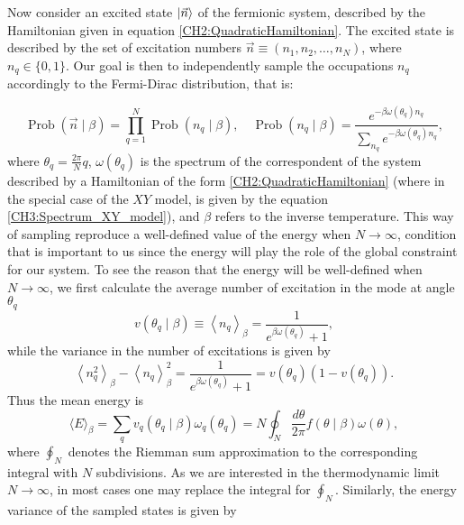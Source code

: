 \indent Now consider an excited state $\mathinner{|{\vec{n}}\rangle}$ of the fermionic system, described by the Hamiltonian given in equation \eqref{CH2:QuadraticHamiltonian}. The excited state is described by the set of excitation numbers $\vec{n}\equiv (n_1,n_2,\ldots,n_N)$, where $n_q \in \{0,1\}$. Our goal is then to independently sample the occupations $n_q$ accordingly to the Fermi-Dirac distribution, that is:

\begin{equation}
\operatorname{Prob}(\vec{n} \mid \beta)=\prod_{q=1}^{N} \operatorname{Prob}\left(n_{q} \mid \beta\right), \quad \operatorname{Prob}\left(n_{q} \mid \beta\right)=\frac{e^{-\beta \omega\left(\theta_{q}\right) n_{q}}}{\sum_{n_{q}} e^{-\beta \omega\left(\theta_{q}\right) n_{q}}},
\label{CH3:Gibbs_Sampling}
\end{equation}
where $\theta_q = \frac{2\pi}{N} q$, $\omega(\theta_q)$ is the spectrum of the correspondent of the system described by a Hamiltonian of the form \eqref{CH2:QuadraticHamiltonian} (where in the special case of the $XY$ model, is given by the equation \eqref{CH3:Spectrum_XY_model}), and $\beta$ refers to the inverse temperature. This way of sampling reproduce a well-defined value of the energy when $N\to\infty$, condition that is important to us since the energy will play the role of the global constraint for our system. To see the reason that the energy will be well-defined when $N\to\infty$, we first calculate the average number of excitation in the mode at angle $\theta_q$
\begin{equation}
v\left(\theta_{q} \mid \beta\right) \equiv\left\langle n_{q}\right\rangle_{\beta}=\frac{1}{e^{\beta \omega\left(\theta_{q}\right)} + 1},
\end{equation}
while the variance in the number of excitations is given by
\begin{equation}
\left\langle n_{q}^{2}\right\rangle_{\beta}-\left\langle n_{q}\right\rangle_{\beta}^{2}=\frac{1}{e^{\beta \omega\left(\theta_{q}\right)} + 1}=v\left(\theta_{q}\right)\left(1 - v\left(\theta_{q}\right)\right).
\end{equation}
Thus the mean energy is
\begin{equation}
\langle E\rangle_{\beta}=\sum_{q} v_{q}\left(\theta_{q} \mid \beta\right) \omega_{q}\left(\theta_{q}\right)=N \oint_{N} \frac{d \theta}{2 \pi} f(\theta \mid \beta) \omega(\theta),
\label{CH3:Approx_to_integral}
\end{equation}
where $\oint_{N}$ denotes the Riemman sum approximation to the corresponding integral with $N$ subdivisions. As we are interested in the thermodynamic limit $N\to \infty$, in most cases one may replace the integral for $\oint_N$. Similarly, the energy variance of the sampled states is given by
